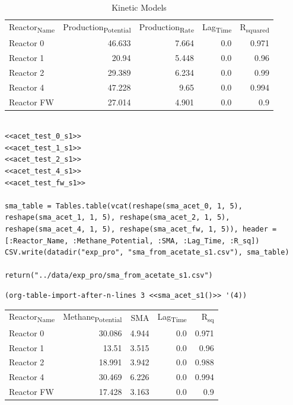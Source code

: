 \documentclass[11pt]{article}
\begin{document}
\begin{table}[htbp]
\caption{Kinetic Models}
\centering
\begin{tabular}{lrrrr}
Reactor\textsubscript{Name} & Production\textsubscript{Potential} & Production\textsubscript{Rate} & Lag\textsubscript{Time} & R\textsubscript{squared}\\[0pt]
Reactor 0 & 46.633 & 7.664 & 0.0 & 0.971\\[0pt]
Reactor 1 & 20.94 & 5.448 & 0.0 & 0.96\\[0pt]
Reactor 2 & 29.389 & 6.234 & 0.0 & 0.99\\[0pt]
Reactor 4 & 47.228 & 9.65 & 0.0 & 0.994\\[0pt]
Reactor FW & 27.014 & 4.901 & 0.0 & 0.9\\[0pt]
\end{tabular}
\end{table}

\begin{verbatim}

<<acet_test_0_s1>>
<<acet_test_1_s1>>
<<acet_test_2_s1>>
<<acet_test_4_s1>>
<<acet_test_fw_s1>>

sma_table = Tables.table(vcat(reshape(sma_acet_0, 1, 5), reshape(sma_acet_1, 1, 5), reshape(sma_acet_2, 1, 5), reshape(sma_acet_4, 1, 5), reshape(sma_acet_fw, 1, 5)), header = [:Reactor_Name, :Methane_Potential, :SMA, :Lag_Time, :R_sq])
CSV.write(datadir("exp_pro", "sma_from_acetate_s1.csv"), sma_table)

return("../data/exp_pro/sma_from_acetate_s1.csv")
\end{verbatim}

\begin{verbatim}
(org-table-import-after-n-lines 3 <<sma_acet_s1()>> '(4))
\end{verbatim}

\begin{center}
\begin{tabular}{lrrrr}
Reactor\textsubscript{Name} & Methane\textsubscript{Potential} & SMA & Lag\textsubscript{Time} & R\textsubscript{sq}\\[0pt]
Reactor 0 & 30.086 & 4.944 & 0.0 & 0.971\\[0pt]
Reactor 1 & 13.51 & 3.515 & 0.0 & 0.96\\[0pt]
Reactor 2 & 18.991 & 3.942 & 0.0 & 0.988\\[0pt]
Reactor 4 & 30.469 & 6.226 & 0.0 & 0.994\\[0pt]
Reactor FW & 17.428 & 3.163 & 0.0 & 0.9\\[0pt]
\end{tabular}
\end{center}
\end{document}
